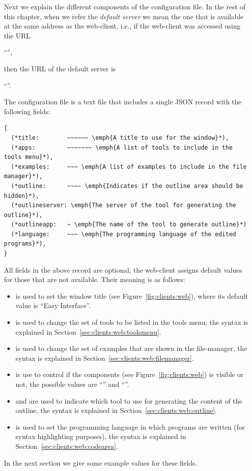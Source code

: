 Next we explain the different components of the configuration file. In
the rest of this chapter, when we refer the \emph{default server} we
mean the one that is available at the same address as the web-client,
i.e., if the web-client was accessed using the URL
%
\begin{center}
``'', 
\end{center}
%
then the URL of the default server is
%
\begin{center}
``''.
\end{center}
%
The configuration file is a text file that includes a single JSON
record with the following fields:

\bigskip
\begin{lstlisting}
{
  (*title:        ~~~~~~ \emph{A title to use for the window}*),
  (*apps:         ~~~~~~~ \emph{A list of tools to include in the tools menu}*),
  (*examples:     ~~~ \emph{A list of examples to include in the file manager}*),
  (*outline:      ~~~~ \emph{Indicates if the outline area should be hidden}*),
  (*outlineserver: \emph{The server of the tool for generating the outline}*),
  (*outlineapp:   ~ \emph{The name of the tool to generate outline}*)
  (*language:     ~~~ \emph{The programming language of the edited programs}*),
}
\end{lstlisting}%

\medskip
\noindent
All fields in the above record are optional, the web-client assigns
default values for those that are not available. Their meaning is as follows:
%
\begin{itemize}
\item {} is used to set the window title (see
  Figure~\ref{fig:clients:web}), where its default value is ``Easy
  Interface''.
%
\item {} is used to change the set of tools to be
  listed in the tools menu, the syntax is explained in
  Section~\ref{sec:clients:web:toolsmenu}.
%
\item {} is used to change the set of examples
  that are shown in the file-manager, the syntax is explained in
  Section~\ref{sec:clients:web:filemanager}.
%
\item {} is use to control if the 
  components (see Figure~\ref{fig:clients:web}) is visible or not, the
  possible values are ``'' and ``''.
%
\item {} and  are
  used to indicate which tool to use for generating the content of the
  outline, the syntax is explained in
  Section~\ref{sec:clients:web:outline}.
%
\item {} is used to set the programming language
  in which programs are written (for syntax highlighting purposes),
  the syntax is explained in Section~\ref{sec:clients:web:codearea}.
\end{itemize}
%
In the next section we give some example values for these fields.


